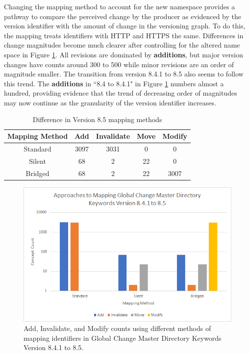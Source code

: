 Changing the mapping method to account for the new namespace provides a pathway to compare the perceived change by the producer as evidenced by the version identifier with the amount of change in the versioning graph.
To do this, the mapping treats identifiers with HTTP and HTTPS the same. 
Differences in change magnitudes become much clearer after controlling for the altered name space in Figure \ref{GCMDC2}.
All revisions are dominated by \textbf{additions}, but major version changes have counts around 300 to 500 while minor revisions are an order of magnitude smaller.
The transition from version 8.4.1 to 8.5 also seems to follow this trend.
The \textbf{additions} in ``8.4 to 8.4.1" in Figure \ref{GCMDC2} numbers almost a hundred, providing evidence that the trend of decreasing order of magnitudes may now continue as the granularity of the version identifier increases.

\begin{table}
	\caption{Difference in Version 8.5 mapping methods}
	\label{table:GCMD_8_5}
	\centering
	\begin{tabular}{|c|c|c|c|c|}
		\hline
		Mapping Method&	Add&	Invalidate&	Move&	Modify\\ \hline
		Standard&	3097&	3031&	0&	0\\
		Silent&	68&	2&	22&	0\\
		Bridged&	68&	2&	22&	3007\\		
		\hline
	\end{tabular}
\end{table}
\begin{figure}%
	\centering
	\includegraphics[scale=.9]{figures/GCMD8_5.png}
	\caption{Add, Invalidate, and Modify counts using different methods of mapping identifiers in Global Change Master Directory Keywords Version 8.4.1 to 8.5.}
	\label{GCMDC2}
\end{figure}


